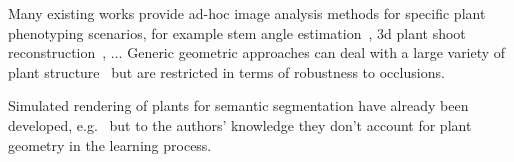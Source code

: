Many existing works provide ad-hoc image analysis methods for specific plant
phenotyping scenarios, for example stem angle
estimation~\cite{das2017automated}, 3d plant shoot
reconstruction~\cite{scharr2017fast}, ... Generic geometric approaches can deal
with a large variety of plant structure~\cite{reeb2018quantification} but are restricted in terms of robustness to
occlusions.

Simulated rendering of plants for semantic segmentation have already
been developed, e.g.~\cite{duboudin_toward_2019} but to the authors' knowledge
they don't account for plant geometry in the learning process.

